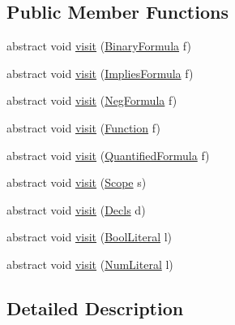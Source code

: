 \subsection*{Public Member Functions}
\begin{DoxyCompactItemize}
\item 
abstract void \hyperlink{classuran_1_1formula_1_1visitor_1_1_abstract_visitor_ae1d53ba07e557623193ae83780fbb7da}{visit} (\hyperlink{classuran_1_1formula_1_1_binary_formula}{Binary\+Formula} f)
\item 
abstract void \hyperlink{classuran_1_1formula_1_1visitor_1_1_abstract_visitor_a3187c0eac87e1d1e168dac4c4afb9ffd}{visit} (\hyperlink{classuran_1_1formula_1_1_implies_formula}{Implies\+Formula} f)
\item 
abstract void \hyperlink{classuran_1_1formula_1_1visitor_1_1_abstract_visitor_a98e90c05d16923d77a97136e0227d65e}{visit} (\hyperlink{classuran_1_1formula_1_1_neg_formula}{Neg\+Formula} f)
\item 
abstract void \hyperlink{classuran_1_1formula_1_1visitor_1_1_abstract_visitor_a77a85766b6d9e1d56db93debe3f1c7b7}{visit} (\hyperlink{classuran_1_1formula_1_1_function}{Function} f)
\item 
abstract void \hyperlink{classuran_1_1formula_1_1visitor_1_1_abstract_visitor_a2a0b836e52b91d5b7076eda3f945a5f5}{visit} (\hyperlink{classuran_1_1formula_1_1_quantified_formula}{Quantified\+Formula} f)
\item 
abstract void \hyperlink{classuran_1_1formula_1_1visitor_1_1_abstract_visitor_afa870c96cefdddb436fcdf22e006d14d}{visit} (\hyperlink{classuran_1_1formula_1_1_scope}{Scope} s)
\item 
abstract void \hyperlink{classuran_1_1formula_1_1visitor_1_1_abstract_visitor_aa53c4043c10971de2f3fba19d25b74a8}{visit} (\hyperlink{classuran_1_1formula_1_1_decls}{Decls} d)
\item 
abstract void \hyperlink{classuran_1_1formula_1_1visitor_1_1_abstract_visitor_ac4da59daf9cda9e46e8f8f018c46c3ce}{visit} (\hyperlink{classuran_1_1formula_1_1_bool_literal}{Bool\+Literal} l)
\item 
abstract void \hyperlink{classuran_1_1formula_1_1visitor_1_1_abstract_visitor_a81a183cdcb00d078c86154e2b4662caa}{visit} (\hyperlink{classuran_1_1formula_1_1_num_literal}{Num\+Literal} l)
\end{DoxyCompactItemize}


\subsection{Detailed Description}


